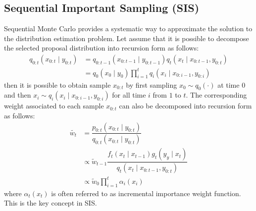 \subsection{Sequential Important Sampling (SIS)}
\label{sec:SIS}
Sequential Monte Carlo provides a systematic way to approximate the solution to the distribution estimation problem. Let assume that it is possible to decompose the selected proposal distribution into recursion form as follows:
\begin{align}
	q_{0:t}(x_{0:t} \mid y_{0:t}) &= q_{0:t-1}(x_{0:t-1} \mid y_{0:t-1}) q_t(x_t \mid x_{0:t-1}, y_{0:t}) \nonumber \\
	             &= q_0(x_0 \mid y_0) \prod^t_{i=1} q_i(x_i \mid x_{0:i-1}, y_{0:i})
\label{eq:q}
\end{align}
then it is possible to obtain sample ${x_{0:t}}$ by first sampling $x_0 \sim q_0(\cdot)$ at time $0$ and then $x_i \sim q_i(x_i \mid x_{0:i-1}, y_{0:i})$ for all time $i$ from $1$ to $t$. The corresponding weight associated to each sample $x_{0:t}$ can also be decomposed into recursion form as follows:
\begin{align}
  \tilde{w_t} &= \dfrac{p_{0:t}(x_{0:t} \mid y_{0:t})}{q_{0:t}(x_{0:t} \mid y_{0:t})} \nonumber \\
              &\propto \tilde{w}_{t-1} \dfrac{f_t(x_t \mid x_{t-1})g_t(y_y \mid x_t)}{q_t(x_t \mid x_{0:t-1}, y_{0:t})} \label{eq:w} \\
              &\propto \tilde{w}_0 \prod^t_{i=1} \alpha_i(x_{i})          
\end{align}
where $\alpha_t(x_{t})$  is often referred to as incremental importance weight function. This is the key concept in SIS.

